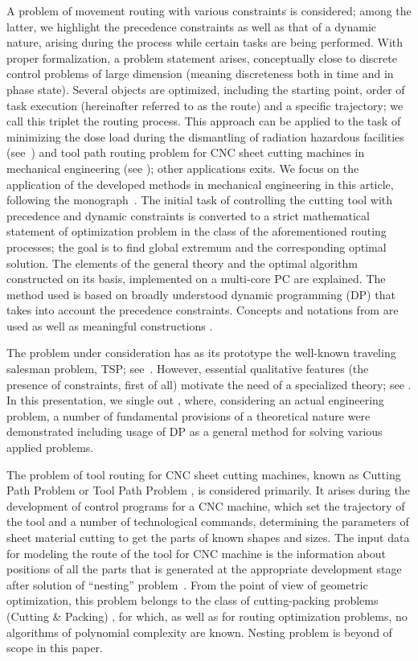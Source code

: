\documentclass[10pt]{article}
\begin{document}
A problem of movement routing
with various constraints is considered;
among the latter, we highlight
the precedence constraints
as well as that of a dynamic nature,
arising during the process while certain tasks are being performed.
With proper formalization, a problem statement arises,
conceptually close to discrete control problems of large dimension
(meaning discreteness both in time and in phase state).
Several objects are optimized,
including the starting point,
order of task execution
(hereinafter referred to as the route)
and a specific trajectory;
we call this triplet
the routing process.
This approach can be applied
to  the task of minimizing the dose load
during the dismantling of radiation hazardous facilities
(see~\cite {1,3})
and tool path routing problem
for CNC sheet cutting machines
in mechanical engineering (see \cite {4,5});
other applications exits.
We focus on the application of the developed methods in mechanical engineering
in this article,
following the monograph~\cite{4}.
The initial task of controlling the cutting tool
with precedence and dynamic constraints
is converted to a strict mathematical statement of
optimization problem
in the class of the aforementioned routing processes;
the goal is to find
global extremum and the corresponding optimal solution.
The elements of the general theory and
the optimal algorithm constructed on its basis,
implemented on a multi-core PC
are explained.
The method used is based on
broadly understood dynamic programming
(DP)
that takes into account the precedence constraints.
Concepts and notations from
\cite[part II]{4}
are used
as well as
meaningful constructions
\cite[part I]{4}.

The problem under consideration
has as its prototype the well-known
traveling salesman problem,
TSP;
see~\cite{7,8,9,10,11,12}.
However, essential qualitative features
(the presence of constraints, first of all)
motivate the need of a specialized theory;
see \cite {1,3,4,5,14}.
In this presentation,
we single out \cite{4},
where, considering an actual engineering problem,
a number of fundamental provisions of a theoretical nature
were demonstrated
including usage of
DP
as a general method for solving various applied problems.

The problem of tool routing for CNC sheet cutting machines,
known as Cutting Path Problem or Tool Path Problem \cite{bibx:100},
is considered primarily.
It arises during the development of control programs for a CNC machine,
which set the trajectory of the tool and a number of technological commands,
determining the parameters of sheet material cutting to get
the parts of known shapes and sizes.
The input data for modeling the route of the tool for CNC machine
is the information about positions of all the parts
that is generated at the appropriate development stage
after solution of ``nesting'' problem~\cite{bibx:101, bibx:102, bibx:303}.
From the point of view of geometric optimization,
this problem belongs to the class of cutting-packing problems
(Cutting \& Packing) \cite{bibx:103},
for which, as well as for routing optimization problems,
no algorithms of polynomial complexity are known.
Nesting problem is beyond of scope in this paper.
\end{document}
